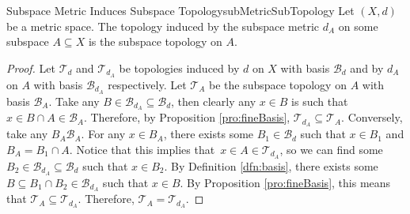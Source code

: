 \documentclass[math, code]{amznotes}
\theoremstyle{remark}
\begin{document}
\begin{probox}{Subspace Metric Induces Subspace Topology}{subMetricSubTopology}
    Let $\left(X, d\right)$ be a metric space. The topology induced by the subspace metric $d_A$ on some subspace $A \subseteq X$ is the subspace topology on $A$.
    \tcblower
    \begin{proof}
        Let $\mathcal{T}_d$ and $\mathcal{T}_{d_A}$ be topologies induced by $d$ on $X$ with basis $\mathcal{B}_d$ and by $d_A$ on $A$ with basis $\mathcal{B}_{d_A}$ respectively. Let $\mathcal{T}_A$ be the subspace topology on $A$ with basis $\mathcal{B}_A$. Take any $B \in \mathcal{B}_{d_A} \subseteq \mathcal{B}_d$, then clearly any $x \in B$ is such that $x \in B \cap A \in \mathcal{B}_A$. Therefore, by Proposition \ref{pro:fineBasis}, $\mathcal{T}_{d_A} \subseteq \mathcal{T}_A$. Conversely, take any $B_A \mathcal{B}_A$. For any $x \in B_A$, there exists some $B_1 \in \mathcal{B}_d$ such that $x \in B_1$ and $B_A = B_1 \cap A$. Notice that this implies that~$x \in A \in \mathcal{T}_{d_A}$, so we can find some $B_2 \in \mathcal{B}_{d_A} \subseteq \mathcal{B}_d$ such that $x \in B_2$. By Definition \ref{dfn:basis}, there exists some $B \subseteq B_1 \cap B_2 \in \mathcal{B}_{d_A}$ such that $x \in B$. By Proposition \ref{pro:fineBasis}, this means that $\mathcal{T}_A \subseteq \mathcal{T}_{d_A}$. Therefore, $\mathcal{T}_A = \mathcal{T}_{d_A}$. 
    \end{proof}
\end{probox}
\end{document}
